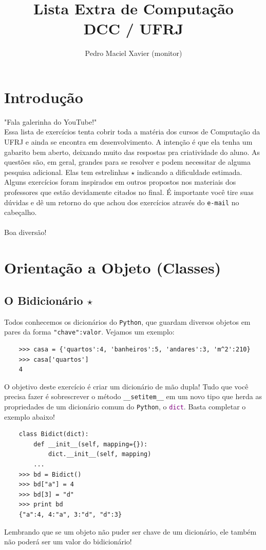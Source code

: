 \documentclass[12pt]{article}
\title{Lista Extra de Computação \\ {\normalsize DCC / UFRJ}}
\author{Pedro Maciel Xavier (monitor)\\ \mono{pedromxavier@poli.ufrj.br}}
\newcommand{\dash}{\textemdash}
\newcommand{\mono}[1]{\texttt{#1}}
\newcommand{\type}[1]{\textcolor{purple}{\mono{#1}}}
\newcommand{\spm}[1]{\mono{\_\_#1\_\_}}
\begin{document}
	\maketitle
	\section*{Introdução}
	\dash "Fala galerinha do YouTube!"\\
	Essa lista de exercícios tenta cobrir toda a matéria dos cursos de Computação da UFRJ e ainda se encontra em desenvolvimento. A intenção é que ela tenha um gabarito bem aberto, deixando muito das respostas pra criatividade do aluno. As questões são, em geral, grandes para se resolver e podem necessitar de alguma pesquisa adicional. Elas tem estrelinhas $\star$ indicando a dificuldade estimada. Alguns exercícios foram inspirados em outros propostos nos materiais dos professores que estão devidamente citados no final. É importante você tire suas dúvidas e dê um retorno do que achou dos exercícios através do \mono{e-mail} no cabeçalho.
	\\ \\
	Boa diversão!
	\pagebreak
	
	\section{Orientação a Objeto (Classes)}
	\subsection{O Bidicionário \cite{asad} $\star$}
	Todos conhecemos os dicionários do \mono{Python}, que guardam diversos objetos em pares da forma \mono{"chave":valor}. Vejamos um exemplo:
	\begin{verbatim}
	>>> casa = {'quartos':4, 'banheiros':5, 'andares':3, 'm^2':210}
	>>> casa['quartos']
	4 
	\end{verbatim}
	O objetivo deste exercício é criar um dicionário de mão dupla! Tudo que você precisa fazer é sobrescrever o método \spm{setitem} em um novo tipo que herda as propriedades de um dicionário comum do \mono{Python}, o \type{dict}. Basta completar o exemplo abaixo!
	\begin{verbatim}
	class Bidict(dict):
	    def __init__(self, mapping={}):
	        dict.__init__(self, mapping)
	    ...
	>>> bd = Bidict()
	>>> bd["a"] = 4
	>>> bd[3] = "d"
	>>> print bd
	{"a":4, 4:"a", 3:"d", "d":3}
	\end{verbatim}
	Lembrando que se um objeto não puder ser chave de um dicionário, ele também não poderá ser um valor do bidicionário!
	
\end{document}
